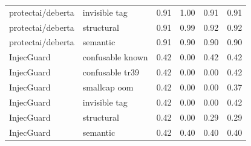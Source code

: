 \begin{table}[ht]
\begin{tabular}{ll cccc}
protectai/deberta & invisible tag & 0.91 & 1.00 & 0.91 & 0.91 \\
protectai/deberta & structural & 0.91 & 0.99 & 0.92 & 0.92 \\
protectai/deberta & semantic & 0.91 & 0.90 & 0.90 & 0.90 \\
InjecGuard & confusable known & 0.42 & 0.00 & 0.42 & 0.42 \\
InjecGuard & confusable tr39 & 0.42 & 0.00 & 0.00 & 0.42 \\
InjecGuard & smallcap oom & 0.42 & 0.00 & 0.00 & 0.37 \\
InjecGuard & invisible tag & 0.42 & 0.00 & 0.00 & 0.42 \\
InjecGuard & structural & 0.42 & 0.00 & 0.29 & 0.29 \\
InjecGuard & semantic & 0.42 & 0.40 & 0.40 & 0.40 \\
\bottomrule
\end{tabular}
\end{table}